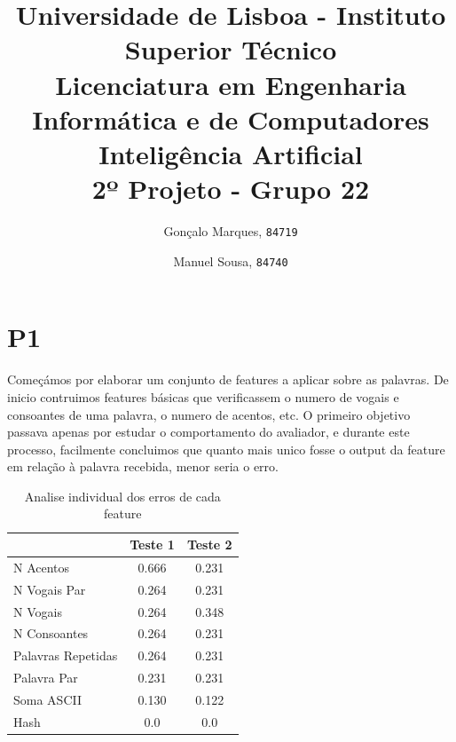 \documentclass[11pt,twocolumn]{article}
\begin{document}
    
    \title{
        \textnormal{
        \LARGE Universidade de Lisboa - Instituto Superior Técnico\\
        \Large Licenciatura em Engenharia Informática e de Computadores\\
        \Large Inteligência Artificial
    \\}
        \LARGE2º Projeto - Grupo 22
        \vspace{-1ex}
        }
    \author{Gonçalo Marques,
        \texttt{84719}
        \and
        Manuel Sousa,
        \texttt{84740}
    }
    \date{	\vspace{-1ex}
            \vspace{-4ex}
        }
    \maketitle
    
    \section*{P1}
    
    Começámos por elaborar um conjunto de features a aplicar sobre as palavras. De inicio contruimos features básicas que verificassem o numero de vogais e consoantes de uma palavra, o numero de acentos, etc. O primeiro objetivo passava apenas por estudar
    o comportamento do avaliador, e durante este processo, facilmente concluimos que quanto mais unico fosse o output da feature em relação à palavra recebida, menor seria o erro.
    
    
    \begin{table}[htbp]
        \centering
        \caption{Analise individual dos erros de cada feature}
        \label{my-label}
        \begin{tabular}{|l|c|c|}
        \hline
        \multicolumn{1}{|r|}{}                                      & \textbf{Teste 1} & \textbf{Teste 2}                    \\ \hline
        [F1] N Acentos & 0.666   & 0.231 \\ \hline
        [F2] N Vogais Par & 0.264   & 0.231 \\ \hline
        [F3] N Vogais & 0.264   & 0.348 \\ \hline
        [F4] N Consoantes   & 0.264  & 0.231      \\ \hline
        [F5] Palavras Repetidas   & 0.264  & 0.231      \\ \hline
        [F6] Palavra Par   & 0.231  & 0.231      \\ \hline
        [F7] Soma ASCII                             & 0.130            & 0.122                                \\ \hline
        [F8] Hash                             & 0.0              & 0.0                                 \\ \hline
        \end{tabular}
        \end{table}
    \par
\end{document}
